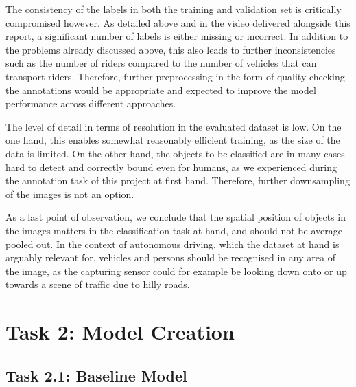 \documentclass{article}
\begin{document}
The consistency of the labels in both the training and validation set is critically compromised however. As detailed above and in the video delivered alongside this report, a significant number of labels is either missing or incorrect. In addition to the problems already discussed above, this also leads to further inconsistencies such as the number of riders compared to the number of vehicles that can transport riders. Therefore, further preprocessing in the form of quality-checking the annotations would be appropriate and expected to improve the model performance across different approaches.

The level of detail in terms of resolution in the evaluated dataset is low. On the one hand, this enables somewhat reasonably efficient training, as the size of the data is limited. On the other hand, the objects to be classified are in many cases hard to detect and correctly bound even for humans, as we experienced during the annotation task of this project at first hand. Therefore, further downsampling of the images is not an option.

As a last point of observation, we conclude that the spatial position of objects in the images matters in the classification task at hand, and should not be average-pooled out. In the context of autonomous driving, which the dataset at hand is arguably relevant for, vehicles and persons should be recognised in any area of the image, as the capturing sensor could for example be looking down onto or up towards a scene of traffic due to hilly roads.

\section*{Task 2: Model Creation}

\subsection*{Task 2.1: Baseline Model}
\end{document}
